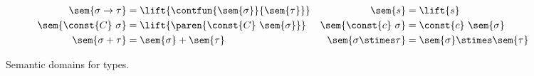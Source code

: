 
\begin{figure}
\centering
\begin{align*}
  \sem {\sigma \rightarrow \tau}
  &= \lift{\contfun{\sem{\sigma}}{\sem{\tau}}}
 &
  \sem {s}   &= \lift{s}
 \\
  \sem {\const{C}\ \sigma}
  &= \lift{\paren{\const{C}\ \sem{\sigma}}}
&
  \sem {\const{c}\ \sigma}
  &= \const{c}\ \sem{\sigma}
 \\
  \sem {\sigma + \tau}
  &= \sem{\sigma} + \sem{\tau}
 &
  \sem {\sigma \stimes \tau}
  &= \sem{\sigma} \stimes \sem{\tau}
\end{align*}
\caption{Semantic domains for types.}
\label{fig:semantics-types}
\end{figure}
